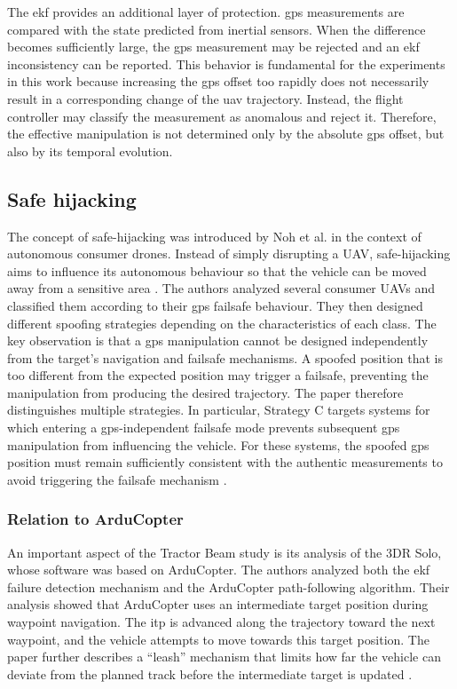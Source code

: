 The \gls{ekf} provides an additional layer of protection.
\gls{gps} measurements are compared with the state predicted from inertial sensors.
When the difference becomes sufficiently large, the \gls{gps} measurement may be rejected and an \gls{ekf} inconsistency can be reported.
This behavior is fundamental for the experiments in this work because increasing the \gls{gps} offset too rapidly does not necessarily result in a corresponding change of the \gls{uav} trajectory.
Instead, the flight controller may classify the measurement as anomalous and reject it.
Therefore, the effective manipulation is not determined only by the absolute \gls{gps} offset, but also by its temporal evolution. 

\subsection{Safe hijacking} The concept of safe-hijacking was introduced by Noh et al. in the context of autonomous consumer drones. Instead of simply disrupting a UAV, safe-hijacking aims to influence its autonomous behaviour so that the vehicle can be moved away from a sensitive area \cite{noh2019tractorbeam}. The authors analyzed several consumer UAVs and classified them according to their \gls{gps} failsafe behaviour. They then designed different spoofing strategies depending on the characteristics of each class. The key observation is that a \gls{gps} manipulation cannot be designed independently from the target's navigation and failsafe mechanisms. A spoofed position that is too different from the expected position may trigger a failsafe, preventing the manipulation from producing the desired trajectory. The paper therefore distinguishes multiple strategies. In particular, Strategy C targets systems for which entering a \gls{gps}-independent failsafe mode prevents subsequent \gls{gps} manipulation from influencing the vehicle. For these systems, the spoofed \gls{gps} position must remain sufficiently consistent with the authentic measurements to avoid triggering the failsafe mechanism \cite{noh2019tractorbeam}. 

\subsubsection{Relation to ArduCopter}
An important aspect of the Tractor Beam study is its analysis of the 3DR Solo, whose software was based on ArduCopter.
The authors analyzed both the \gls{ekf} failure detection mechanism and the ArduCopter path-following algorithm.
Their analysis showed that ArduCopter uses an intermediate target position during waypoint navigation.
The \gls{itp} is advanced along the trajectory toward the next waypoint, and the vehicle attempts to move towards this target position.
The paper further describes a ``leash'' mechanism that limits how far the vehicle can deviate from the planned track before the intermediate target is updated \cite{noh2019tractorbeam}.

